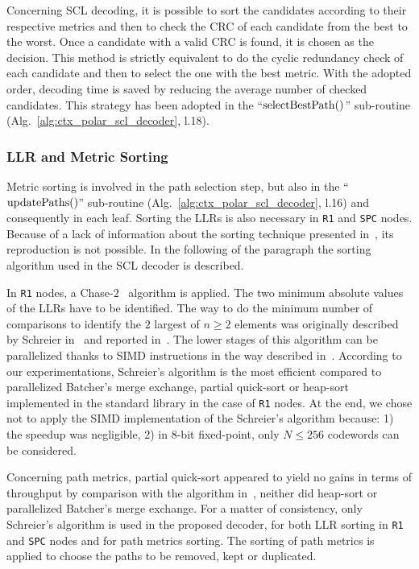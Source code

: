 Concerning SCL decoding, it is possible to sort the candidates according to
their respective metrics and then to check the CRC of each candidate from the
best to the worst. Once a candidate with a valid CRC is found, it is chosen as
the decision. This method is strictly equivalent to do the cyclic redundancy
check of each candidate and then to select the one with the best metric. With
the adopted order, decoding time is saved by reducing the average number of
checked candidates. This strategy has been adopted in the
``$\operatorname*{selectBestPath}()$'' sub-routine (Alg.~\ref{alg:ctx_polar_scl_decoder},
l.18).

\subsubsection{LLR and Metric Sorting}
\label{sec:opt_polar_scl_sorting}

Metric sorting is involved in the path selection step, but also
in the ``$\operatorname*{updatePaths}()$'' sub-routine (Alg.~\ref{alg:ctx_polar_scl_decoder},
l.16) and consequently in each leaf. Sorting the LLRs is also necessary in
\verb|R1| and \verb|SPC| nodes. Because of a lack of information about the
sorting technique presented in~\cite{Sarkis2016}, its reproduction is not
possible. In the following of the paragraph the sorting algorithm used in the
SCL decoder is described.

In \verb|R1| nodes, a Chase-$2$~\cite{Chase1972} algorithm is applied. The two
minimum absolute values of the LLRs have to be identified. The way to do the
minimum number of comparisons to identify the $2$ largest of $n\geq2$ elements
was originally described by Schreier in~\cite{Schreier1932} and reported
in~\cite{Knuth1973}. The lower stages of this algorithm can be parallelized
thanks to SIMD instructions in the way described in~\cite{Furtak2007}. According
to our experimentations, Schreier's algorithm is the most efficient compared to
parallelized Batcher's merge exchange, partial quick-sort or heap-sort
implemented in the \Cxx standard library in the case of \verb|R1| nodes. At the
end, we chose not to apply the SIMD implementation of the Schreier's algorithm
because: 1) the speedup was negligible, 2) in 8-bit fixed-point, only
$N \leq 256$ codewords can be considered.

Concerning path metrics, partial quick-sort appeared to yield no gains in terms
of throughput by comparison with the algorithm in~\cite{Schreier1932}, neither
did heap-sort or parallelized Batcher's merge exchange. For a matter of
consistency, only Schreier's algorithm is used in the proposed decoder, for both
LLR sorting in \verb|R1| and \verb|SPC| nodes and for path metrics sorting. The
sorting of path metrics is applied to choose the paths to be removed, kept or
duplicated.

